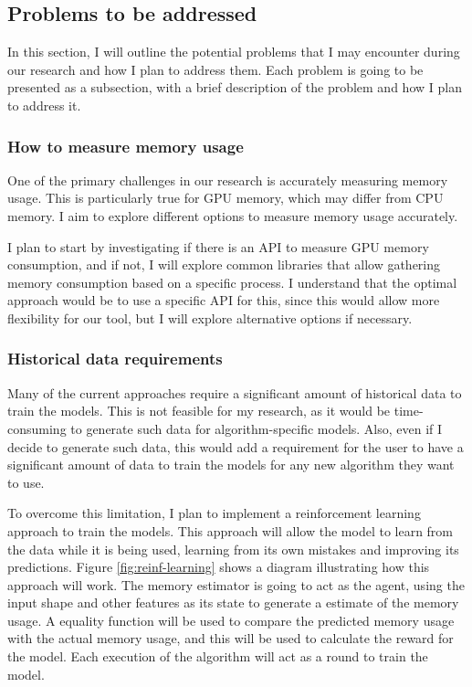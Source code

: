 \subsection{Problems to be addressed}
\label{subsec:problems-to-be-addressed}

In this section, I will outline the potential problems that I may encounter during our research and how I plan to address them.
Each problem is going to be presented as a subsection, with a brief description of the problem and how I plan to address it.

\subsubsection{How to measure memory usage}

One of the primary challenges in our research is accurately measuring memory usage.
This is particularly true for \ac{GPU} memory, which may differ from \ac{CPU} memory.
I aim to explore different options to measure memory usage accurately.

I plan to start by investigating if there is an API to measure \ac{GPU} memory consumption, and if not, I will explore common libraries that allow gathering memory consumption based on a specific process.
I understand that the optimal approach would be to use a specific API for this, since this would allow more flexibility for our tool, but I will explore alternative options if necessary.

\subsubsection{Historical data requirements}

Many of the current approaches require a significant amount of historical data to train the models.
This is not feasible for my research, as it would be time-consuming to generate such data for algorithm-specific models.
Also, even if I decide to generate such data, this would add a requirement for the user to have a significant amount of data to train the models for any new algorithm they want to use.

To overcome this limitation, I plan to implement a reinforcement learning approach to train the models.
This approach will allow the model to learn from the data while it is being used, learning from its own mistakes and improving its predictions.
Figure \ref{fig:reinf-learning} shows a diagram illustrating how this approach will work.
The memory estimator is going to act as the agent, using the input shape and other features as its state to generate a estimate of the memory usage.
A equality function will be used to compare the predicted memory usage with the actual memory usage, and this will be used to calculate the reward for the model.
Each execution of the algorithm will act as a round to train the model.

